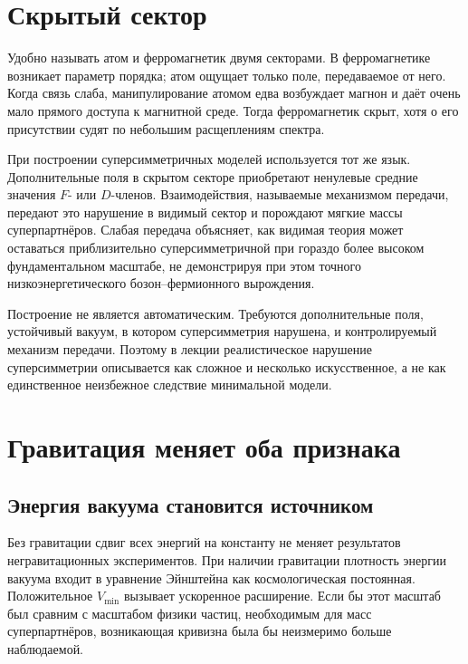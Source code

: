 \section{Скрытый сектор}

Удобно называть атом и ферромагнетик двумя секторами. В ферромагнетике возникает параметр порядка; атом ощущает только поле, передаваемое от него. Когда связь слаба, манипулирование атомом едва возбуждает магнон и даёт очень мало прямого доступа к магнитной среде. Тогда ферромагнетик скрыт, хотя о его присутствии судят по небольшим расщеплениям спектра.

При построении суперсимметричных моделей используется тот же язык. Дополнительные поля в скрытом секторе приобретают ненулевые средние значения \(F\)- или \(D\)-членов. Взаимодействия, называемые механизмом передачи, передают это нарушение в видимый сектор и порождают мягкие массы суперпартнёров. Слабая передача объясняет, как видимая теория может оставаться приблизительно суперсимметричной при гораздо более высоком фундаментальном масштабе, не демонстрируя при этом точного низкоэнергетического бозон--фермионного вырождения.

Построение не является автоматическим. Требуются дополнительные поля, устойчивый вакуум, в котором суперсимметрия нарушена, и контролируемый механизм передачи. Поэтому в лекции реалистическое нарушение суперсимметрии описывается как сложное и несколько искусственное, а не как единственное неизбежное следствие минимальной модели.

\section{Гравитация меняет оба признака}

\subsection{Энергия вакуума становится источником}

Без гравитации сдвиг всех энергий на константу не меняет результатов негравитационных экспериментов. При наличии гравитации плотность энергии вакуума входит в уравнение Эйнштейна как космологическая постоянная. Положительное \(V_{\min}\) вызывает ускоренное расширение. Если бы этот масштаб был сравним с масштабом физики частиц, необходимым для масс суперпартнёров, возникающая кривизна была бы неизмеримо больше наблюдаемой.

\begin{classroomqa}
\end{classroomqa}

